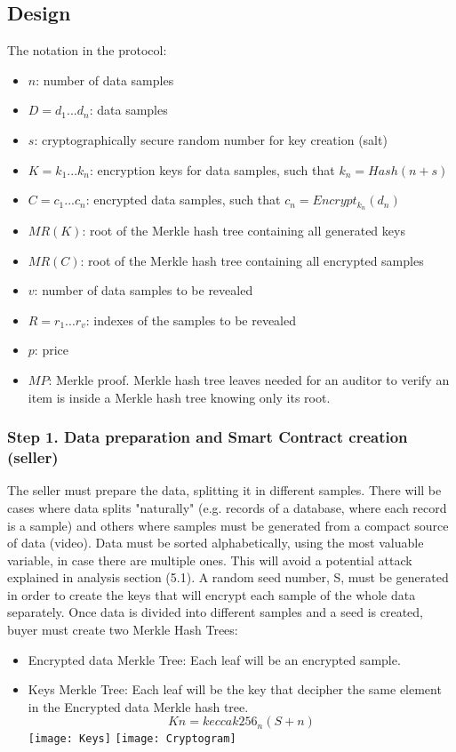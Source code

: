 \documentclass[]{article}
\begin{document}
\subsection{Design}
The notation in the protocol:
\begin{itemize}
	\item $n$: number of data samples	
	\item $D = d_1 ... d_n$: data samples
	\item $s$: cryptographically secure random number for key creation (salt)
	\item $K = k_1 ... k_n$: encryption keys for data samples, such that $k_n = Hash(n + s)$
	\item $C = c_1 ... c_n$: encrypted data samples, such that $c_n = Encrypt_k_n(d_n)$	
	\item $MR(K)$: root of the Merkle hash tree containing all generated keys
	\item $MR(C)$: root of the Merkle hash tree containing all encrypted samples
	\item $v$: number of data samples to be revealed
	\item $R = r_1 ... r_v$: indexes of the samples to be revealed
	\item $p$: price
	\item $MP$: Merkle proof. Merkle hash tree leaves needed for an auditor to verify an item is inside a Merkle hash tree knowing only its root.
\end{itemize}


\subsubsection{Step 1. Data preparation and Smart Contract creation (seller)}
The seller must prepare the data, splitting it in different samples. There will be cases where data splits "naturally" (e.g. records of a database, where each record is a sample) and others where samples must be generated from a compact source of data (video).
Data must be sorted alphabetically, using the most valuable variable, in case there are multiple ones. This will avoid a potential attack explained in analysis section (5.1).
A random seed number, S, must be generated in order to create the keys that will encrypt each sample of the whole data separately. Once data is divided into different samples and a seed is created, buyer must create two Merkle Hash Trees:
\begin{itemize}
	\item Encrypted data Merkle Tree: Each leaf will be an encrypted sample.
	\item Keys Merkle Tree: Each leaf will be the key that decipher the same element in the Encrypted data Merkle hash tree.
\begin{equation}
Kn = keccak256_n(S+n)
\end{equation}
\texttt{[image: Keys]}
\texttt{[image: Cryptogram]}
\end{itemize}
\end{document}
